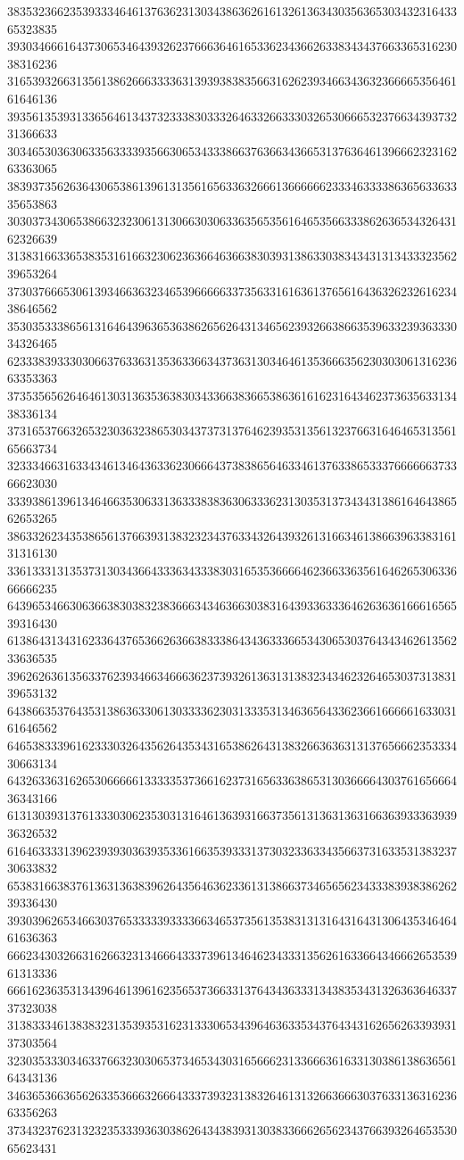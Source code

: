 38353236623539333464613763623130343863626161326136343035636530343231643365323835
39303466616437306534643932623766636461653362343662633834343766336531623038316236
31653932663135613862666333363139393838356631626239346634363236666535646161646136
39356135393133656461343732333830333264633266333032653066653237663439373231366633
30346530363063356333393566306534333866376366343665313763646139666232316263363065
38393735626364306538613961313561656336326661366666623334633338636563363335653863
30303734306538663232306131306630306336356535616465356633386263653432643162326639
31383166336538353161663230623636646366383039313863303834343131343332356239653264
37303766653061393466363234653966666337356331616361376561643632623261623438646562
35303533386561316464396365363862656264313465623932663866353963323936333034326465
62333839333030663763363135363366343736313034646135366635623030306131623663353363
37353565626464613031363536383034336638366538636161623164346237363563313438336134
37316537663265323036323865303437373137646239353135613237663164646531356165663734
32333466316334346134643633623066643738386564633461376338653337666666373366623030
33393861396134646635306331363338383630633362313035313734343138616464386562653265
38633262343538656137663931383232343763343264393261316634613866396338316131316130
33613331313537313034366433363433383031653536666462366336356164626530633666666235
64396534663063663830383238366634346366303831643933633364626363616661656539316430
61386431343162336437653662636638333864343633366534306530376434346261356233636535
39626263613563376239346634666362373932613631313832343462326465303731383139653132
64386635376435313863633061303333623031333531346365643362366166666163303161646562
64653833396162333032643562643534316538626431383266363631313765666235333430663134
64326336316265306666613333353736616237316563363865313036666430376165666436343166
61313039313761333030623530313164613639316637356131363136316636393336393936326532
61646333313962393930363935336166353933313730323363343566373163353138323730633832
65383166383761363136383962643564636233613138663734656562343338393838626239336430
39303962653466303765333339333366346537356135383131316431643130643534646461636363
66623430326631626632313466643337396134646234333135626163366434666265353961313336
66616236353134396461396162356537366331376434363331343835343132636364633737323038
31383334613838323135393531623133306534396463633534376434316265626339393137303564
32303533303463376632303065373465343031656662313366636163313038613863656164343136
34636536636562633536663266643337393231383264613132663666303763313631623663356263
37343237623132323533393630386264343839313038336662656234376639326465353065623431
